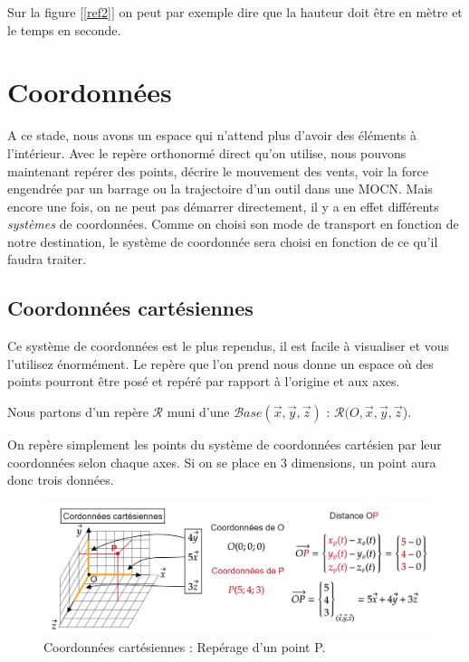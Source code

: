 \documentclass[
	11pt, %
	fleqn, %
	a4paper, %
]{LegrandOrangeBook}
\begin{document}
Sur la figure [\ref{ref2}] on peut par exemple dire que la hauteur doit être en mètre et le temps en seconde. 

\section{Coordonnées}
A ce stade, nous avons un espace qui n'attend plus d'avoir des éléments à l'intérieur. Avec le repère orthonormé direct qu'on utilise, nous pouvons maintenant repérer des points, décrire le mouvement des vents, voir la force engendrée par un barrage ou la trajectoire d'un outil dans une MOCN. Mais encore une fois, on ne peut pas démarrer directement, il y a en effet différents \textit{systèmes} de coordonnées. Comme on choisi son mode de transport en fonction de notre destination, le système de coordonnée sera choisi en fonction de ce qu'il faudra traiter.

\subsection{Coordonnées cartésiennes}
Ce système de coordonnées est le plus rependus, il est facile à visualiser et vous l'utilisez énormément. Le repère que l'on prend nous donne un espace où des points pourront être posé et repéré par rapport à l'origine et aux axes.

Nous partons d'un repère $\mathcal{R}$ muni d'une $\mathcal{B}ase(\Vec{x}, \Vec{y}, \Vec{z})$ : $\mathcal{R}(O, \Vec{x}, \Vec{y}, \Vec{z}$).

On repère simplement les points du système de coordonnées cartésien par leur coordonnées selon chaque axes. Si on se place en 3 dimensions, un point aura donc trois données.

\begin{figure}[H] %
	\centering %
	\includegraphics[width=1\textwidth]{Images/cart0.png} %
	\caption{Coordonnées cartésiennes : Repérage d'un point P.}
	\label{cart0} %
\end{figure}
\end{document}
